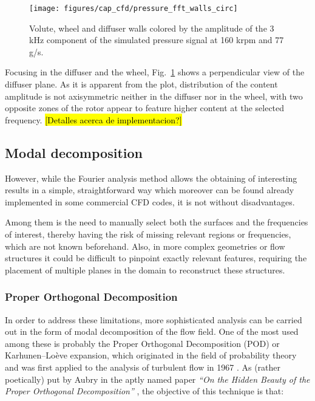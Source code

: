 \begin{figure}[h!]
\centering
\texttt{[image: figures/cap\_cfd/pressure\_fft\_walls\_circ]}
\caption{Volute, wheel and diffuser walls colored by the amplitude of the 3 kHz component of the simulated pressure signal at 160 krpm and 77 g/s.}
\label{fig:pressure_fft_walls_circ}
\end{figure}

Focusing in the diffuser and the wheel, Fig.~\ref{fig:pressure_fft_walls_circ} shows a perpendicular view of the diffuser plane. As it is apparent from the plot, distribution of the content amplitude is not axisymmetric neither in the diffuser nor in the wheel, with two opposite zones of the rotor appear to feature higher content at the selected frequency. \hl{[Detalles acerca de implementacion?]}

\subsection{Modal decomposition}

However, while the Fourier analysis method allows the obtaining of interesting results in a simple, straightforward way which moreover can be found already implemented in some commercial CFD codes, it is not without disadvantages.

Among them is the need to manually select both the surfaces and the frequencies of interest, thereby having the risk of missing relevant regions or frequencies, which are not known beforehand. Also, in more complex geometries or flow structures it could be difficult to pinpoint exactly relevant features, requiring the placement of multiple planes in the domain to reconstruct these structures.

\subsubsection{Proper Orthogonal Decomposition}

In order to address these limitations, more sophisticated analysis can be carried out in the form of modal decomposition of the flow field. One of the most used among these is probably the Proper Orthogonal Decomposition (POD) or Karhunen--Loève expansion, which originated in the field of probability theory and was first applied to the analysis of turbulent flow in 1967 \cite{lumley1967structure} . As (rather poetically) put by Aubry in the aptly named paper \emph{``On the Hidden Beauty of the Proper Orthogonal Decomposition''} \cite{aubry1991hidden}, the objective of this technique is that:\\

